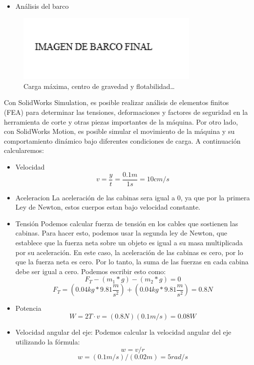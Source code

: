 \documentclass[letterpaper]{article}
\begin{document}
\begin{itemize}
	\item Análisis del barco
\end{itemize}
\begin{figure}[H]
	\centering
	\includegraphics[width=0.8\textwidth]{imgbarcofinal.png}
	\caption{Carga máxima, centro de gravedad y flotabilidad\ldots}
	\label{fig:imagen3}
\end{figure}
\newpage
Con SolidWorks Simulation, es posible realizar análisis de elementos finitos (FEA) para determinar las tensiones, deformaciones y factores de seguridad en la herramienta de corte y otras piezas importantes de la máquina.
Por otro lado, con SolidWorks Motion, es posible simular el movimiento de la máquina y su comportamiento dinámico bajo diferentes condiciones de carga.
\newline
A continuación calcularemos:

\begin{itemize}
	\item Velocidad
	      \newline
	      $$v=\frac{y}{t}=\frac{0.1m}{1s}=10cm/s$$
	\item Aceleracion
	      \newline
	      La aceleración de las cabinas sera igual a 0, ya que por la primera Ley de Newton, estos cuerpos
	      estan bajo velocidad constante.
	\item Tensión
	      \newline
	      Podemos calcular fuerza de tensión en los cables que sostienen las cabinas. Para hacer esto, podemos usar la segunda ley de Newton, que establece que la fuerza neta sobre un objeto es igual a su masa multiplicada por su aceleración. En este caso, la aceleración de las cabinas es cero, por lo que la fuerza neta es cero. Por lo tanto, la suma de las fuerzas en cada cabina debe ser igual a cero. Podemos escribir esto como:
	      \newline
	      $$F_{T}-\left ( m_{1}*g \right )-\left ( m_{2}*g \right )=0$$
	      $$F_{T}=\left ( 0.04kg*9.81\frac{m}{{s}^2} \right )+\left ( 0.04kg*9.81\frac{m}{{s}^2} \right )=0.8N$$
	\item Potencia
	      $$W=2T\cdot v=\left ( 0.8N \right )\left ( 0.1m/s \right )=0.08W$$
	\item Velocidad angular del eje:
	      \newline
	      Podemos calcular la velocidad angular del eje utilizando la fórmula:
	      \newline
	      $$w = v/r$$
	      $$w =\left ( 0.1m/s \right )/\left ( 0.02m \right )=5 rad/s$$
\end{itemize}
\end{document}
